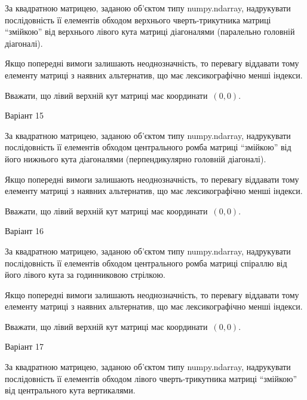 \documentclass[11pt]{article}
\begin{document}
За квадратною матрицею, заданою об'єктом типу numpy.ndarray, надрукувати послідовність її елементів обходом верхнього чверть-трикутника матриці ``змійкою'' від верхнього лівого кута матриці діагоналями (паралельно головній діагоналі).

\vspace{2mm}
Якщо попередні вимоги залишають неоднозначність, то перевагу віддавати тому елементу матриці з наявних альтернатив, що має лексикографічно менші індекси.

Вважати, що лівий верхній кут матриці має координати~$(0,0)$.



{\Large \center  Варіант  15\par \bigskip\bigskip}

За квадратною матрицею, заданою об'єктом типу numpy.ndarray, надрукувати послідовність її елементів обходом центрального ромба матриці ``змійкою'' від його нижнього кута діагоналями (перпендикулярно головній діагоналі).

\vspace{2mm}
Якщо попередні вимоги залишають неоднозначність, то перевагу віддавати тому елементу матриці з наявних альтернатив, що має лексикографічно менші індекси.

Вважати, що лівий верхній кут матриці має координати~$(0,0)$.



{\Large \center  Варіант  16\par \bigskip\bigskip}

За квадратною матрицею, заданою об'єктом типу numpy.ndarray, надрукувати послідовність її елементів обходом центрального ромба матриці спіраллю від його лівого кута за годинниковою стрілкою.

\vspace{2mm}
Якщо попередні вимоги залишають неоднозначність, то перевагу віддавати тому елементу матриці з наявних альтернатив, що має лексикографічно менші індекси.

Вважати, що лівий верхній кут матриці має координати~$(0,0)$.



{\Large \center  Варіант  17\par \bigskip\bigskip}

За квадратною матрицею, заданою об'єктом типу numpy.ndarray, надрукувати послідовність її елементів обходом лівого чверть-трикутника матриці ``змійкою'' від центрального кута вертикалями.
\end{document}
